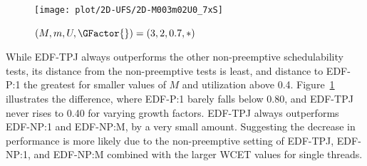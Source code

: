 \begin{figure}
  \texttt{[image: plot/2D-UFS/2D-M003m02U0\_7xS]}
  \caption{${(M,m,U,\GFactor{}) = (3,2,0.7,*)}$}
  \label{fig:M3U.7}
\end{figure}

While EDF-TPJ always outperforms the other non-preemptive
schedulability tests, its distance from the non-preemptive tests is
least, and distance to EDF-P:1 the greatest for smaller values of
${M}$ and utilization above 0.4. Figure~\ref{fig:M3U.7}
illustrates the difference, where EDF-P:1 barely falls below 0.80, and
EDF-TPJ never rises to 0.40 for varying growth factors. EDF-TPJ
always outperforms EDF-NP:1 and EDF-NP:M, by a very small
amount. Suggesting the decrease in performance is more likely due to
the non-preemptive setting of EDF-TPJ, EDF-NP:1, and EDF-NP:M combined
with the larger WCET values for single threads.
